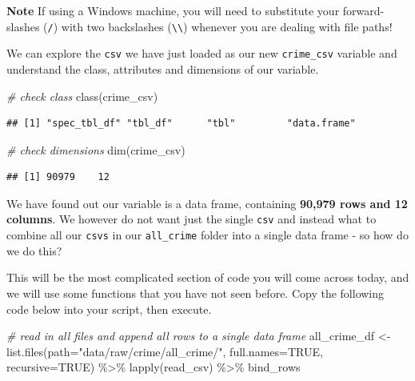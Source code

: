 \documentclass[
]{book}
\newenvironment{Shaded}{\begin{snugshade}}{\end{snugshade}}
\newcommand{\AttributeTok}[1]{\textcolor[rgb]{0.77,0.63,0.00}{#1}}
\newcommand{\CommentTok}[1]{\textcolor[rgb]{0.56,0.35,0.01}{\textit{#1}}}
\newcommand{\ConstantTok}[1]{\textcolor[rgb]{0.00,0.00,0.00}{#1}}
\newcommand{\FunctionTok}[1]{\textcolor[rgb]{0.00,0.00,0.00}{#1}}
\newcommand{\NormalTok}[1]{#1}
\newcommand{\OtherTok}[1]{\textcolor[rgb]{0.56,0.35,0.01}{#1}}
\newcommand{\SpecialCharTok}[1]{\textcolor[rgb]{0.00,0.00,0.00}{#1}}
\newcommand{\StringTok}[1]{\textcolor[rgb]{0.31,0.60,0.02}{#1}}
\begin{document}
\textbf{Note}
If using a Windows machine, you will need to substitute your forward-slashes (\texttt{/}) with two backslashes (\texttt{\textbackslash{}\textbackslash{}}) whenever you are dealing with file paths!

We can explore the \texttt{csv} we have just loaded as our new \texttt{crime\_csv} variable and understand the class, attributes and dimensions of our variable.

\begin{Shaded}
\begin{Highlighting}[]
\CommentTok{\# check class }
\FunctionTok{class}\NormalTok{(crime\_csv)}
\end{Highlighting}
\end{Shaded}

\begin{verbatim}
## [1] "spec_tbl_df" "tbl_df"      "tbl"         "data.frame"
\end{verbatim}

\begin{Shaded}
\begin{Highlighting}[]
\CommentTok{\# check dimensions}
\FunctionTok{dim}\NormalTok{(crime\_csv)}
\end{Highlighting}
\end{Shaded}

\begin{verbatim}
## [1] 90979    12
\end{verbatim}

We have found out our variable is a data frame, containing \textbf{90,979 rows and 12 columns}. We however do not want just the single \texttt{csv} and instead what to combine all our \texttt{csv\textquotesingle{}s} in our \texttt{all\_crime} folder into a single data frame - so how do we do this?

This will be the most complicated section of code you will come across today, and we will use some functions that you have not seen before. Copy the following code below into your script, then execute.

\begin{Shaded}
\begin{Highlighting}[]
\CommentTok{\# read in all files and append all rows to a single data frame}
\NormalTok{all\_crime\_df }\OtherTok{\textless{}{-}} \FunctionTok{list.files}\NormalTok{(}\AttributeTok{path=}\StringTok{"data/raw/crime/all\_crime/"}\NormalTok{, }\AttributeTok{full.names=}\ConstantTok{TRUE}\NormalTok{, }\AttributeTok{recursive=}\ConstantTok{TRUE}\NormalTok{) }\SpecialCharTok{\%\textgreater{}\%}
  \FunctionTok{lapply}\NormalTok{(read\_csv) }\SpecialCharTok{\%\textgreater{}\%}
\NormalTok{  bind\_rows}
\end{Highlighting}
\end{Shaded}
\end{document}

